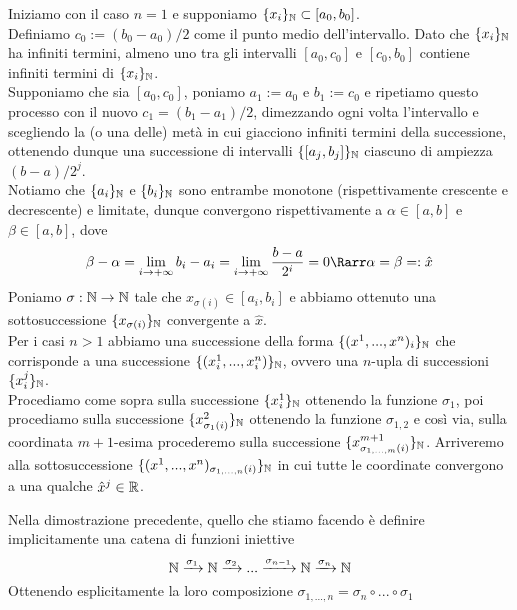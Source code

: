 \documentclass[openany]{book}
\begin{document}
    Iniziamo con il caso $n=1$ e supponiamo $\{x_i\}_{\mathbb{N}} \subset [a_0,b_0]$.\\
    Definiamo $c_0 := (b_0 - a_0)/2$ come il punto medio dell'intervallo. Dato che $\{x_i\}_{\mathbb{N}}$ ha infiniti termini, almeno uno tra gli intervalli $[a_0, c_0]$ e $[c_0, b_0]$ contiene infiniti termini di $\{x_i\}_{\mathbb{N}}$.\\
    Supponiamo che sia $[a_0,c_0]$, poniamo $a_1 := a_0$ e $b_1:= c_0$ e ripetiamo questo processo con il nuovo $c_1 = (b_1 - a_1)/2$, dimezzando ogni volta l'intervallo e scegliendo la (o una delle) metà in cui giacciono infiniti termini della successione, ottenendo dunque una successione di intervalli $\{[a_j, b_j]\}_{\mathbb{N}}$ ciascuno di ampiezza $(b-a)/2^j$.\\
    Notiamo che $\{a_i\}_{\mathbb{N}}$ e $\{b_i\}_{\mathbb{N}}$ sono entrambe monotone (rispettivamente crescente e decrescente) e limitate, dunque convergono rispettivamente a $\alpha \in [a,b]$ e $\beta \in [a,b]$, dove 
    \[\beta - \alpha = \lim_{i\to+\infty}b_i - a_i = \lim_{i\to+\infty} \frac{b-a}{2^i} = 0 \Rarr \alpha = \beta=: \hat{x}\]
    Poniamo $\sigma:\mathbb{N} \to \mathbb{N}$ tale che $x_{\sigma(i)} \in [a_i, b_i]$ e abbiamo ottenuto una sottosuccessione $\{x_{\sigma(i)}\}_{\mathbb{N}}$ convergente a $\hat{x}$.\\
    Per i casi $n>1$ abbiamo una successione della forma $\{(x^1,...,x^n)_i\}_{\mathbb{N}}$ che corrisponde a una successione $\{(x^1_i,...,x^n_i)\}_{\mathbb{N}}$, ovvero una $n$-upla di successioni $\{x^j_i\}_{\mathbb{N}}$.\\
    Procediamo come sopra sulla successione $\{x^1_i\}_{\mathbb{N}}$ ottenendo la funzione $\sigma_1$, poi procediamo sulla successione $\{x^2_{\sigma_1(i)}\}_{\mathbb{N}}$ ottenendo la funzione $\sigma_{1,2}$ e così via, sulla coordinata $m+1$-esima procederemo sulla successione $\{x^{m+1}_{\sigma_{1,...,m}(i)}\}_{\mathbb{N}}$.
    Arriveremo alla sottosuccessione $\{(x^1,...,x^n)_{\sigma_{1,...,n}(i)}\}_{\mathbb{N}}$ in cui tutte le coordinate convergono a una qualche $\hat{x}^j \in \mathbb{R}$.

\begin{remark}{}{}
    Nella dimostrazione precedente, quello che stiamo facendo è definire implicitamente una catena di funzioni iniettive
    \[\mathbb{N} \xrightarrow{\sigma_1} \mathbb{N} \xrightarrow{\sigma_{2}}... \xrightarrow{\sigma_{n-1}}\mathbb{N} \xrightarrow{\sigma_{n}} \mathbb{N}\]
    Ottenendo esplicitamente la loro composizione $\sigma_{1,...,n} = \sigma_n \circ ... \circ \sigma_1$
\end{remark}
\end{document}
